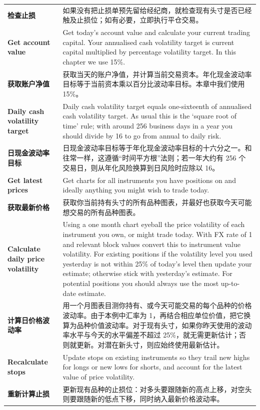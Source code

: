 \begin{bilingualtableblock}
{\begin{tabularx}{\textwidth}{@{} p{} Y@{}}
\textbf{检查止损} & 如果没有把止损单预先留给经纪商，就检查现有头寸是否已经触及止损位；如有必要，立即执行平仓交易。 \\
\textbf{Get account value} & Get today's account value and calculate your current trading capital. Your annualised cash volatility target is current capital multiplied by percentage volatility target. In this chapter we use 15\%. \\
\textbf{获取账户净值} & 获取当天的账户净值，并计算当前交易资本。年化现金波动率目标等于当前资本乘以百分比波动率目标。本章中我们使用 15\%。 \\
\textbf{Daily cash volatility target} & Daily cash volatility target equals one-sixteenth of annualised cash volatility target. As usual this is the ‘square root of time' rule; with around 256 business days in a year you should divide by 16 to go from annual to daily risk. \\
\textbf{日现金波动率目标} & 日现金波动率目标等于年化现金波动率目标的十六分之一。和往常一样，这遵循“时间平方根”法则；若一年大约有 256 个交易日，则从年化风险换算到日风险时应除以 16。 \\
\textbf{Get latest prices} & Get charts for all instruments you have positions on and ideally anything you might wish to trade today. \\
\textbf{获取最新价格} & 获取你当前持有头寸的所有品种图表，并最好也获取今天可能想交易的所有品种图表。 \\
\textbf{Calculate daily price volatility} & Using a one month chart eyeball the price volatility of each instrument you own, or might trade today. With FX rate of 1 and relevant block values convert this to instrument value volatility. For existing positions if the volatility level you used yesterday is not within 25\% of today's level then update your estimate; otherwise stick with yesterday's estimate. For potential positions you should always use the most up-to-date estimate. \\
\textbf{计算日价格波动率} & 用一个月图表目测你持有、或今天可能交易的每个品种的价格波动率。由于本例中汇率为 1，再结合相应单位价值，把它换算为品种价值波动率。对于现有头寸，如果你昨天使用的波动率水平与今天的水平偏差不超过 25\%，就无需更新估计；否则就更新。对潜在新头寸，则应始终使用最新估计。 \\
\textbf{Recalculate stops} & Update stops on existing instruments so they trail new highs for longs or new lows for shorts, and account for the latest value of price volatility. \\
\textbf{重新计算止损} & 更新现有品种的止损位：对多头要跟随新的高点上移，对空头则要跟随新的低点下移，同时纳入最新价格波动率。 \\

\end{tabularx}}
\end{bilingualtableblock}
